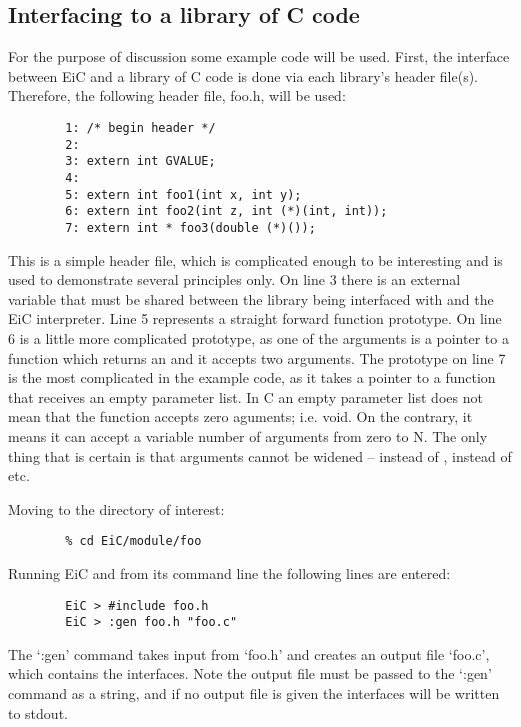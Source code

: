 \subsection{Interfacing to a library of C code}
\label{sec:interface_ccode}


For the purpose of discussion some example code will be used. First,
the interface between EiC and a library of C code is done via each
library's header file(s). Therefore, the following header file, foo.h,
will be used:

\small
\begin{verbatim}
        1: /* begin header */
        2: 
        3: extern int GVALUE;
        4: 
        5: extern int foo1(int x, int y);
        6: extern int foo2(int z, int (*)(int, int));
        7: extern int * foo3(double (*)());
\end{verbatim}
\normalsize

This is a simple header file, which is complicated enough to be
interesting and is used to demonstrate several principles only.  On
line 3 there is an external variable that must be shared between the
library being interfaced with and the EiC interpreter. Line 5
represents a straight forward function prototype.  On line 6 is a
little more complicated prototype, as one of the arguments is a
pointer to a function which returns an  and it accepts two
 arguments. The prototype on line 7 is the most complicated in
the example code, as it takes a pointer to a function that receives an
empty parameter list. In C an empty parameter list does not mean that
the function accepts zero aguments; i.e. void. On the contrary, it
means it can accept a variable number of arguments from zero to N. The
only thing that is certain is that arguments cannot be widened --
 instead of ,  instead of  etc.

        
Moving to the directory of interest:

\small
\begin{verbatim}
        % cd EiC/module/foo
\end{verbatim}
\normalsize

Running EiC and from its command line the following lines are entered:

\small
\begin{verbatim}
        EiC > #include foo.h
        EiC > :gen foo.h "foo.c"
\end{verbatim}
\normalsize

The `:gen' command takes input from `foo.h' and creates an output file
`foo.c', which contains the interfaces.  Note the output file must be
passed to the `:gen' command as a string, and if no output file is
given the interfaces will be written to stdout.

